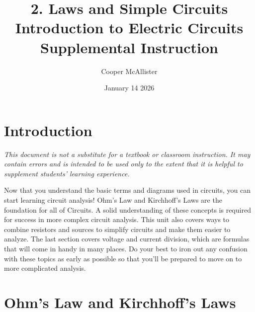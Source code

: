 \documentclass{article}
\title{2. Laws and Simple Circuits \\  \large Introduction to Electric Circuits \\ Supplemental Instruction}
\author{Cooper McAllister}
\date{January 14 2026}
\begin{document}
 {
	\fancyhf{}
	\renewcommand{\headrulewidth}{0pt}
	\renewcommand{\footrulewidth}{0.4pt}
	\fancyfoot[R]{\thepage}
}
\pagestyle{footerstyle}
\maketitle
\thispagestyle{footerstyle}
\section{Introduction}
\begin{center}
\textit{This document is not a substitute for a textbook or classroom instruction. It may contain errors and is intended to be used only to the extent that it is helpful to supplement students' learning experience.}
\end{center}
Now that you understand the basic terms and diagrams used in circuits, you can start learning circuit analysis! Ohm's Law and Kirchhoff's Laws are the foundation for all of Circuits. A solid understanding of these concepts is required for success in more complex circuit analysis. This unit also covers ways to combine resistors and sources to simplify circuits and make them easier to analyze. The last section covers voltage and current division, which are formulas that will come in handy in many places. Do your best to iron out any confusion with these topics as early as possible so that you'll be prepared to move on to more complicated analysis.

\section{Ohm's Law and Kirchhoff's Laws}
\end{document}
